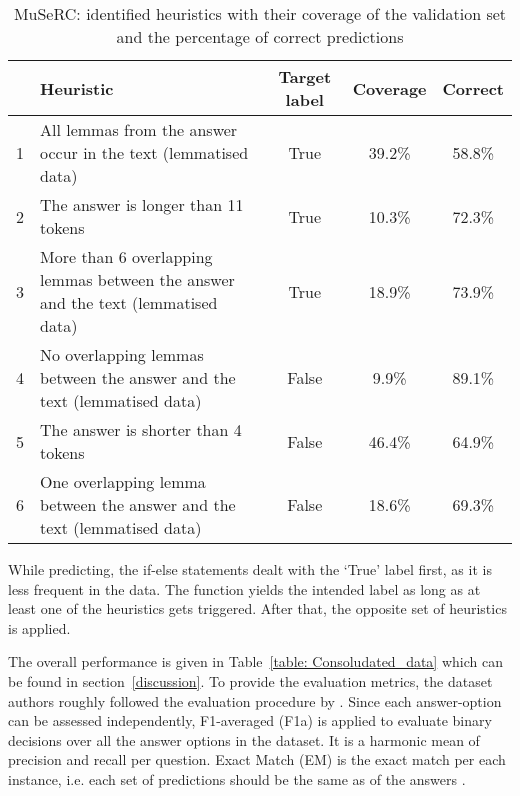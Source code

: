 \documentclass[11pt]{article}
\begin{document}
\begin{table}[htbp]
\centering
    \begin{tabular}{|c|p{}|c|c|c|}
        \hline
        & \textbf{Heuristic} & \textbf{Target label} & \textbf{Coverage} & \textbf{Correct} \\
        \hline
        1 & All lemmas from the answer occur in the text (lemmatised data)& True & 39.2\%  & 58.8\% \\
        \hline
        2 & The answer is longer than 11 tokens & True & 10.3\%  & 72.3\% \\
        \hline
        3 & More than 6 overlapping lemmas between the answer and the text (lemmatised data)& True & 18.9\%  & 73.9\% \\
        \hline
        4 & No overlapping lemmas between the answer and the text (lemmatised data)& False & 9.9\%  & 89.1\% \\
        \hline
        5 & The answer is shorter than 4 tokens & False & 46.4\%  & 64.9\% \\
        \hline
        6 & One overlapping lemma between the answer and the text (lemmatised data)& False & 18.6\% & 69.3\% \\
        \hline
    \end{tabular}

    \caption{MuSeRC: identified heuristics with their coverage of the validation set and the percentage of correct predictions}
    \label{table:MuSeRC_heuristics}
\end{table}

While predicting, the if-else statements dealt with the `True' label first, as it is less frequent in the data. The function yields the intended label as long as at least one of the heuristics gets triggered. After that, the opposite set of heuristics is applied. 

The overall performance is given in Table~\ref{table: Consoludated_data} which can be found in section~\ref{discussion}. To provide the evaluation metrics, the dataset authors roughly followed the evaluation procedure by \cite{DBLP:journals/corr/abs-1810-12885, Khashabi2018LookingBT}. Since each answer-option can be assessed independently, F1-averaged (F1a) is applied to evaluate binary decisions over all the answer options in the dataset. It is a harmonic mean of precision and recall per question. Exact Match (EM) is the exact match per each instance, i.e. each set of predictions should be the same as of the answers \cite{fenogenova-etal-2020-read}.
\end{document}
